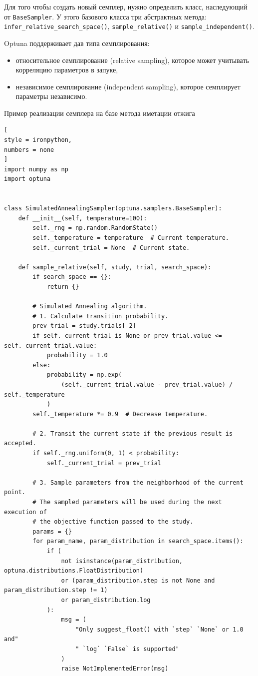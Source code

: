 \documentclass[%
	11pt,
	a4paper,
	utf8,
		]{article}
\begin{document}
Для того чтобы создать новый семплер, нужно определить класс, наследующий от \verb|BaseSampler|. У этого базового класса три абстрактных метода: \verb|infer_relative_search_space()|, \verb|sample_relative()| и \verb|sample_independent()|.

Optuna поддерживает дав типа семплирования:
\begin{itemize}
	\item относительное семплирование (relative sampling), которое может учитывать корреляцию параметров в запуке,
	
	\item независимое семплирование (independent sampling), которое семплирует параметры независимо.
\end{itemize}

Пример реализации семплера на базе метода иметации отжига
\begin{lstlisting}[
style = ironpython,
numbers = none
]
import numpy as np
import optuna


class SimulatedAnnealingSampler(optuna.samplers.BaseSampler):
	def __init__(self, temperature=100):
		self._rng = np.random.RandomState()
		self._temperature = temperature  # Current temperature.
		self._current_trial = None  # Current state.

	def sample_relative(self, study, trial, search_space):
		if search_space == {}:
			return {}

		# Simulated Annealing algorithm.
		# 1. Calculate transition probability.
		prev_trial = study.trials[-2]
		if self._current_trial is None or prev_trial.value <= self._current_trial.value:
			probability = 1.0
		else:
			probability = np.exp(
				(self._current_trial.value - prev_trial.value) / self._temperature
			)
		self._temperature *= 0.9  # Decrease temperature.

		# 2. Transit the current state if the previous result is accepted.
		if self._rng.uniform(0, 1) < probability:
			self._current_trial = prev_trial

		# 3. Sample parameters from the neighborhood of the current point.
		# The sampled parameters will be used during the next execution of
		# the objective function passed to the study.
		params = {}
		for param_name, param_distribution in search_space.items():
			if (
				not isinstance(param_distribution, optuna.distributions.FloatDistribution)
				or (param_distribution.step is not None and param_distribution.step != 1)
				or param_distribution.log
			):
				msg = (
					"Only suggest_float() with `step` `None` or 1.0 and"
					" `log` `False` is supported"
				)
				raise NotImplementedError(msg)


\end{lstlisting}
\end{document}
